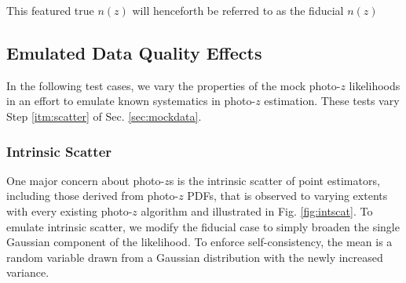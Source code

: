 \documentclass[iop]{emulateapj}
\begin{document}
This featured true $n(z)$ will henceforth be referred to as the fiducial $n(z)$

\subsection{Emulated Data Quality Effects}
\label{sec:likelihoods}

In the following test cases, we vary the properties of the mock photo-$z$ 
likelihoods in an effort to emulate known systematics in photo-$z$ estimation.  
These tests vary Step \ref{itm:scatter} of Sec. \ref{sec:mockdata}.

\subsubsection{Intrinsic Scatter}
\label{sec:intscat}

One major concern about photo-$z$s is the intrinsic scatter of point 
estimators, including those derived from photo-$z$ PDFs, that is observed to 
varying extents with every existing photo-$z$ algorithm and illustrated in Fig. 
\ref{fig:intscat}.  To emulate intrinsic scatter, we modify the fiducial case 
to simply broaden the single Gaussian component of the likelihood.  To enforce 
self-consistency, the mean is a random variable drawn from a Gaussian 
distribution with the newly increased variance.
\end{document}
